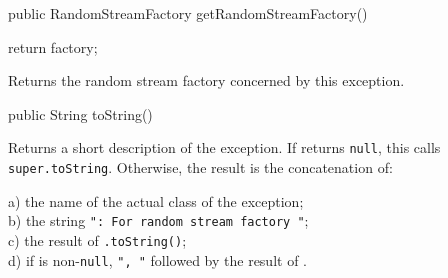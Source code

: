 \begin{code}

   public RandomStreamFactory getRandomStreamFactory()\begin{hide} {
      return factory;
   }\end{hide}
\end{code}
\begin{tabb}   Returns the random stream factory concerned by this exception.
\end{tabb}
\begin{htmlonly}
\end{htmlonly}
\begin{code}

   public String toString()\begin{hide} {
      if (factory == null)
         return super.toString();

      StringBuffer sb = new StringBuffer (getClass().getName());
      sb.append (": For random stream factory ");
      sb.append (factory.toString());
      String msg = getMessage();
      if (msg != null)
         sb.append (", ").append (msg);
      return sb.toString();
   }
}\end{hide}
\end{code}
\begin{tabb}   Returns a short description of the exception.
 If  returns \texttt{null},
 this calls \texttt{super.toString}. Otherwise, the
 result is the concatenation of:
\end{tabb}
\begin{tabbb}
  a) the name of the actual class of the exception;\\
  b) the string \texttt{": For random stream factory "};\\
  c) the result of \texttt{.toString()};\\
  d) if  is non-\texttt{null},
     \texttt{", "} followed by the result of 
     .
\end{tabbb}
\begin{htmlonly}
\end{htmlonly}
